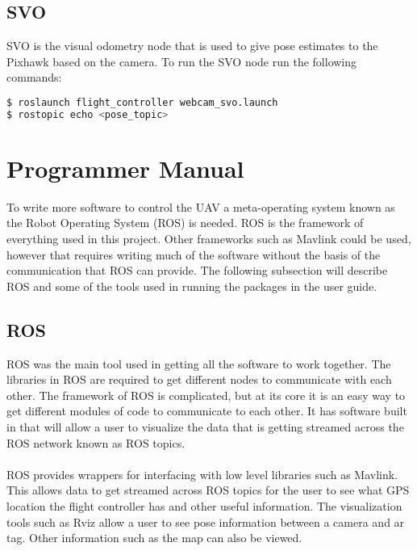 \subsection{SVO}
SVO is the visual odometry node that is used to give pose estimates to the Pixhawk based on the camera. To run the SVO node run the following commands:
\begin{lstlisting}[language=bash]
$ roslaunch flight_controller webcam_svo.launch
$ rostopic echo <pose_topic>
\end{lstlisting}
\section{Programmer Manual}
To write more software to control the UAV a meta-operating system known as the Robot Operating System (ROS) is needed. ROS is the framework of everything used in this project. Other frameworks such as Mavlink could be used, however that requires writing much of the software without the basis of the communication that ROS can provide. The following subsection will describe ROS and some of the tools used in running the packages in the user guide.
\subsection{ROS}
ROS was the main tool used in getting all the software to work together. The libraries in ROS are required to get different nodes to communicate with each other. The framework of ROS is complicated, but at its core it is an easy way to get different modules of code to communicate to each other. It has software built in that will allow a user to visualize the data that is getting streamed across the ROS network known as ROS topics.\\
\\
ROS provides wrappers for interfacing with low level libraries such as Mavlink. This allows data to get streamed across ROS topics for the user to see what GPS location the flight controller has and other useful information. The visualization tools such as Rviz allow a user to see pose information between a camera and ar tag. Other information such as the map can also be viewed.

